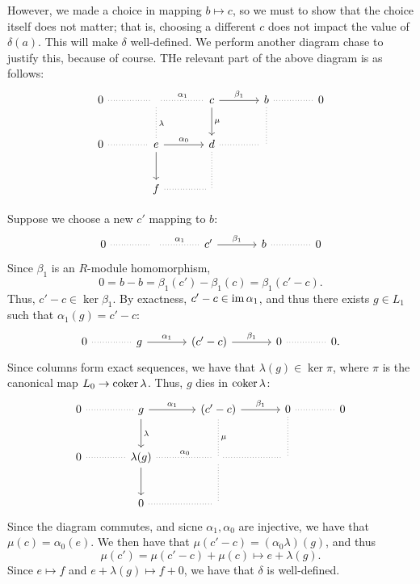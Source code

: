 However, we made a choice in mapping $b\mapsto c$, so we must to show that the choice itself does not matter; that is, choosing a different $c$ does not impact the value of $\delta (a)$. This will make $\delta $ well-defined. We perform another diagram chase to justify this, because of course. THe relevant part of the above diagram is as follows:
\[\begin{tikzcd}[row sep=2.5em, column sep=3.5em]
	0\arrow[r, dotted, no head]&\arrow[d, dotted, no head, "\lambda "]\arrow[r, dotted, no head, "\alpha _1"]&c\arrow[r, "\beta _1"]\arrow[d, "\mu "]&b\arrow[r, dotted, no head]\arrow[d, dotted, no head]&0\\
	0\arrow[r, dotted, no head]&e\arrow[r, "\alpha _0"]\arrow[d]&d\arrow[r, dotted, no head]\arrow[d, dotted, no head]&\,\\
				   &f\arrow[r, dotted, no head]&\,
\end{tikzcd}\]

Suppose we choose a new $c'$ mapping to $b$:
\[\begin{tikzcd}[row sep=2.5em, column sep=3.5em]
	0\arrow[r, dotted, no head]&\arrow[r, dotted, no head,"\alpha _1"]&c'\arrow[r, "\beta _1"]&b\arrow[r, dotted, no head]&0
\end{tikzcd}\]
Since $\beta _1$ is an $R$-module homomorphism,
\[
	0=b-b=\beta _1(c')-\beta _1(c)=\beta_1(c'-c)
.\]
Thus, $c'-c\in \ker \beta _1$. By exactness, $c'-c\in \operatorname{im} \alpha _1$, and thus there exists $g\in L_1$ such that $\alpha _1(g)=c'-c$:
\[\begin{tikzcd}[row sep=2.5em, column sep=3.5em]
	0\arrow[r, dotted, no head]&g\arrow[r, "\alpha _1"]&(c'-c)\arrow[r, "\beta _1"]&0\arrow[r, dotted, no head]&0.
\end{tikzcd}\]
Since columns form exact sequences, we have that $\lambda (g)\in \ker \pi $, where $\pi $ is the canonical map $L_0 \to \operatorname{coker} \lambda $. Thus, $g$ dies in $\operatorname{coker} \lambda $:
\[\begin{tikzcd}[row sep=2.5em, column sep=3.5em]
	0\arrow[r, dotted, no head]&g\arrow[d, "\lambda "]\arrow[r, "\alpha _1"]&(c'-c)\arrow[r, "\beta _1"]\arrow[d, dotted, no head, "\mu "]&0\arrow[r, dotted, no head]\arrow[d, dotted, no head]&0\\
	0\arrow[r, dotted, no head]&\lambda (g)\arrow[r, dotted, no head, "\alpha _0"]\arrow[d]&\arrow[r, dotted, no head]\arrow[d, dotted, no head]&\,\\
				   &0\arrow[r, dotted, no head]&\,
\end{tikzcd}\]
Since the diagram commutes, and sicne $\alpha _1,\alpha _0$ are injective, we have that $\mu (c)=\alpha _0(e)$. We then have that $\mu (c'-c)=(\alpha _0\lambda )(g)$, and thus
\[
	\mu (c')=\mu (c'-c)+\mu (c)\mapsto e+\lambda (g)
.\]
Since $e\mapsto f$ and $e+\lambda (g)\mapsto f+0$, we have that $\delta$ is well-defined.

